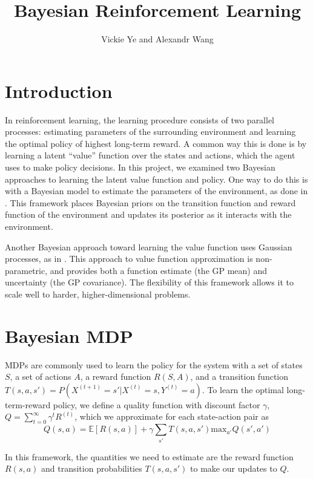 \documentclass[10pt, twocolumn, twoside]{article}
\title{Bayesian Reinforcement Learning}
\date{}
\author {Vickie Ye and Alexandr Wang}
\begin{document}
\maketitle

\section{Introduction}
In reinforcement learning, the learning procedure consists of two parallel processes:
estimating parameters of the surrounding environment and learning the optimal policy
of highest long-term reward. A common way this is done is by learning a latent ``value''
function over the states and actions, which the agent uses to make policy decisions.
In this project, we examined two Bayesian approaches to learning the latent value function
and policy. One way to do this is with a Bayesian model to estimate the parameters of the
environment, as done in \cite{strens}. This framework places Bayesian priors on the
transition function and reward function of the environment and updates its posterior
as it interacts with the environment. 

Another Bayesian approach toward learning the value function uses Gaussian processes, as
in \cite{engel}. This approach to value function approximation is non-parametric, and
provides both a function estimate (the GP mean) and uncertainty (the GP covariance).
The flexibility of this framework allows it to scale well to harder, higher-dimensional
problems.

\section{Bayesian MDP}
MDPs are commonly used to learn the policy for the system with a set of states $S$,
a set of actions $A$, a reward function $R(S, A)$, and a transition function
$T(s, a, s') = P(X^{(t+1)} = s' | X^{(t)} = s, Y^{(t)} = a)$. To learn the optimal
long-term-reward policy, we define a quality function with discount factor
$\gamma$, $Q = \sum_{t=0}^\infty \gamma^t R^{(t)}$, which we approximate for each
state-action pair as
\begin{equation*}
Q(s, a) = \mathbb{E}[R(s,a)]+\gamma\sum_{s'}T(s, a, s')\textrm{max}_{a'} Q(s',a')
\end{equation*}

In this framework, the quantities we need to estimate are the reward function
$R(s, a)$ and transition probabilities $T(s, a, s')$ to make our updates to $Q$.
\end{document}
